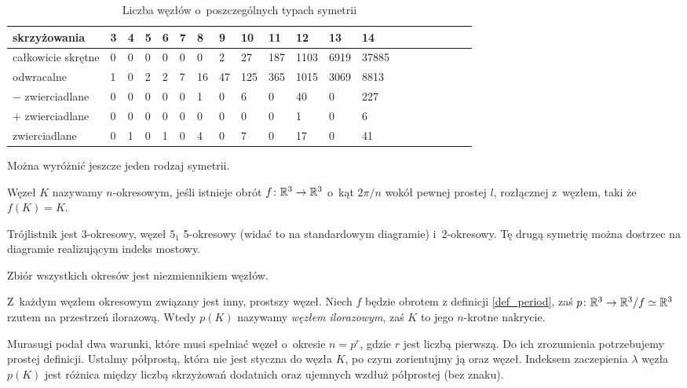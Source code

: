 \begin{table}[h]
    \centering
    \begin{tabular}{@{}*{20}l@{}} \toprule
        skrzyżowania & 3 & 4 & 5 & 6 & 7 & 8 & 9 & 10 & 11 & 12 & 13 & 14 \\ \midrule
        całkowicie skrętne & 0 & 0 & 0 & 0 & 0 & 0 & 2 & 27 & 187 & 1103 & 6919 & 37885 \\
        odwracalne & 1 & 0 & 2 & 2 & 7 & 16 & 47 & 125 & 365 & 1015 & 3069 & 8813 \\
        $-$ zwierciadlane & 0 & 0 & 0 & 0 & 0 & 1 & 0 & 6 & 0 & 40 & 0 & 227 \\
        $+$ zwierciadlane & 0 & 0 & 0 & 0 & 0 & 0 & 0 & 0 & 0 & 1 & 0 & 6 \\
        zwierciadlane & 0 & 1 & 0 & 1 & 0 & 4 & 0 & 7 & 0 & 17 & 0 & 41 \\
        \bottomrule
        \hline
    \end{tabular}
    \caption{Liczba węzłów o~poszczególnych typach symetrii}
    \label{tablica_wezlow}
\end{table}

Można wyróżnić jeszcze jeden rodzaj symetrii.

\begin{definition} \label{def_period}
    Węzeł $K$ nazywamy $n$-okresowym, jeśli istnieje obrót $f \colon \mathbb R^3 \to \mathbb R^3$ o~kąt $2\pi/n$ wokół pewnej prostej $l$, rozłącznej z~węzłem, taki że $f(K) = K$.
\end{definition}

Trójlistnik jest 3-okresowy, węzeł $5_1$ 5-okresowy (widać to na standardowym diagramie) i~2-okresowy.
Tę drugą symetrię można dostrzec na diagramie realizującym indeks mostowy.

\begin{proposition}
    Zbiór wszystkich okresów jest niezmiennikiem węzłów.
\end{proposition}

Z~każdym węzłem okresowym związany jest inny, prostszy węzeł.
Niech $f$ będzie obrotem z definicji \ref{def_period}, zaś $p \colon \mathbb R^3 \to \mathbb R^3/f \simeq \mathbb R^3$ rzutem na przestrzeń ilorazową.
Wtedy $p(K)$ nazywamy \emph{węzłem ilorazowym}, zaś $K$ to jego $n$-krotne nakrycie.

Murasugi podał dwa warunki, które musi spełniać węzeł o~okresie $n = p^r$, gdzie $r$ jest liczbą pierwszą.
Do ich zrozumienia potrzebujemy prostej definicji.
Ustalmy półprostą, która nie jest styczna do węzła $K$, po czym zorientujmy ją oraz węzeł.
Indeksem zaczepienia $\lambda$ węzła $p(K)$ jest różnica między liczbą skrzyżowań dodatnich oraz ujemnych wzdłuż półprostej (bez znaku).

